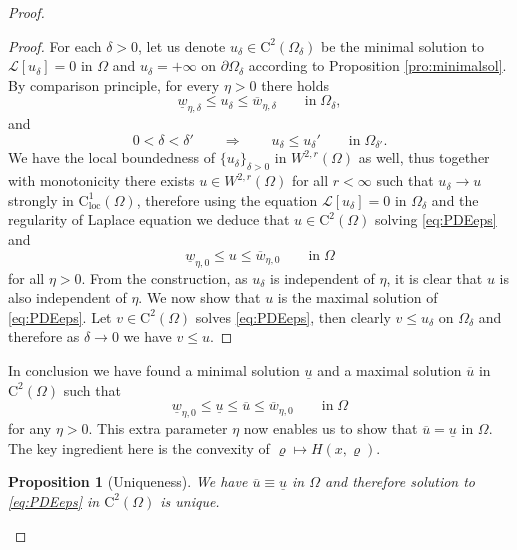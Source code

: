 \documentclass[11pt,reqno]{amsart}
\numberwithin{figure}{section}
\theoremstyle{plain}
\newtheorem{prop}[thm]{Proposition}
\theoremstyle{remark}
\numberwithin{equation}{section}
\newcommand{\rmC}{\mathrm{C}}
\begin{document}
\begin{proof}
\begin{proof} For each $\delta>0$, let us denote $u_\delta\in \mathrm{C}^2(\Omega_\delta)$ be the minimal solution to $\mathcal{L}[u_\delta] = 0$ in $\Omega$ and $u_\delta = +\infty$ on $\partial\Omega_\delta$ according to Proposition \ref{pro:minimalsol}. By comparison principle, for every $\eta>0$ there holds
\begin{equation*}
    \underline{w}_{\eta,\delta} \leq u_\delta \leq \overline{w}_{\eta,\delta} \qquad\text{in}\;\Omega_\delta,
\end{equation*}
and
\begin{equation*}
    0<\delta<\delta' \qquad \Longrightarrow\qquad u_\delta \leq u_\delta' \qquad\text{in}\;\Omega_{\delta'}.
\end{equation*}
We have the local boundedness of $\{u_\delta\}_{\delta>0}$ in $W^{2,r}(\Omega)$ as well, thus together with monotonicity there exists $u\in W^{2,r}(\Omega)$ for all $r<\infty$ such that $u_\delta\to u$ strongly in $\rmC^1_{\mathrm{loc}}(\Omega)$, therefore using the equation $\mathcal{L}[u_\delta] = 0$ in $\Omega_\delta$ and the regularity of Laplace equation we deduce that $u\in \mathrm{C}^2(\Omega)$ solving \eqref{eq:PDEeps} and 
\begin{equation*}
    \underline{w}_{\eta,0} \leq u\leq \overline{w}_{\eta,0} \qquad\text{in}\;\Omega
\end{equation*}
for all $\eta>0$. From the construction, as $u_\delta$ is independent of $\eta$, it is clear that $u$ is also independent of $\eta$. We now show that $u$ is the maximal solution of \eqref{eq:PDEeps}. Let $v\in\rmC^2(\Omega)$ solves \eqref{eq:PDEeps}, then clearly $v\leq u_\delta$ on $\Omega_\delta$ and therefore as $\delta \to 0$ we have $v\leq u$.
\end{proof}
\noindent In conclusion we have found a minimal solution $\underline{u}$ and a maximal solution $\overline{u}$ in $\rmC^2(\Omega)$ such that
\begin{equation}\label{e:chain}
    \underline{w}_{\eta,0} \leq \underline{u}\leq \overline{u}\leq \overline{w}_{\eta,0} \qquad\text{in}\;\Omega
\end{equation}
for any $\eta>0$. This extra parameter $\eta$ now enables us to show that $\overline{u} = \underline{u}$ in $\Omega$. The key ingredient here is the convexity of $\varrho\mapsto H(x,\varrho)$.

\begin{prop}[Uniqueness] We have $\overline{u}\equiv \underline{u}$ in $\Omega$ and therefore solution to \eqref{eq:PDEeps} in $\mathrm{C}^2(\Omega)$ is unique.
\end{prop}


\end{proof}
\end{document}
